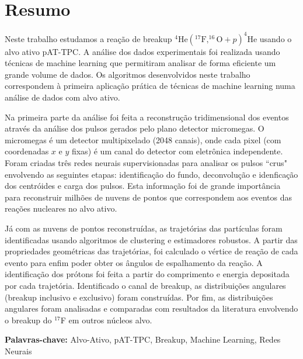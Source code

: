 \documentclass[a4paper,12pt,oneside]{book}
\begin{document}
\chapter*{Resumo}
\thispagestyle{empty}
\par Neste trabalho estudamos a reação de breakup $^4\mathrm{He}(^{17}\mathrm{F},^{16}\mathrm{O}+p)^4\mathrm{He}$ usando o alvo ativo pAT-TPC. A análise dos dados experimentais foi realizada usando técnicas de machine learning que permitiram analisar de forma eficiente um grande volume de dados. Os algoritmos desenvolvidos neste trabalho correspondem à primeira aplicação prática de técnicas de machine learning numa análise de dados com alvo ativo.

\par Na primeira parte da análise foi feita a reconstrução tridimensional dos eventos através da análise dos pulsos gerados pelo plano detector micromegas. O micromegas é um detector multipixelado (2048 canais), onde cada pixel (com coordenadas $x$ e $y$ fixas) é um canal do detector com eletrônica independente. Foram criadas três redes neurais supervisionadas para analisar os pulsos ``crus" envolvendo as seguintes etapas: identificação do fundo, deconvolução e idenficação dos centróides e carga dos pulsos. Esta informação foi de grande importância para reconstruir milhões de nuvens de pontos que correspondem aos eventos das reações nucleares no alvo ativo.

\par Já com as nuvens de pontos reconstruídas, as trajetórias das partículas foram identificadas usando algoritmos de clustering e estimadores robustos. A partir das propriedades geométricas das trajetórias, foi calculado o vértice de reação de cada evento para enfim poder obter os ângulos de espalhamento da reação. A identificação dos prótons foi feita a partir do comprimento e energia depositada por cada trajetória. Identificado o canal de breakup, as distribuições angulares (breakup inclusivo e exclusivo) foram construídas. Por fim, as distribuições angulares foram analisadas e comparadas com resultados da literatura envolvendo o breakup do $^{17}$F em outros núcleos alvo.
\par \textbf{Palavras-chave:} Alvo-Ativo, pAT-TPC, Breakup, Machine Learning, Redes Neurais
 
\end{document}

